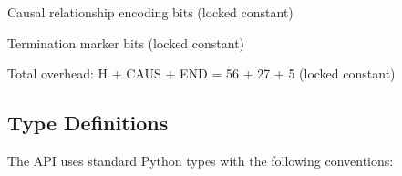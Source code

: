 \documentclass[letterpaper,10pt,english]{sphinxmanual}
\begin{document}

\begin{fulllineitems}
\label{\detokenize{api_reference:CLF_MAXIMAL_VALIDATOR_FINAL.CAUS}}
\pysigstartsignatures
\pysigline
{}
\pysigstopsignatures
\sphinxAtStartPar
Causal relationship encoding bits (locked constant)

\end{fulllineitems}


\begin{fulllineitems}
\label{\detokenize{api_reference:CLF_MAXIMAL_VALIDATOR_FINAL.END}}
\pysigstartsignatures
\pysigline
{}
\pysigstopsignatures
\sphinxAtStartPar
Termination marker bits (locked constant)

\end{fulllineitems}


\begin{fulllineitems}
\label{\detokenize{api_reference:CLF_MAXIMAL_VALIDATOR_FINAL.OVERHEAD}}
\pysigstartsignatures
\pysigline
{}
\pysigstopsignatures
\sphinxAtStartPar
Total overhead: H + CAUS + END = 56 + 27 + 5 (locked constant)

\end{fulllineitems}



\subsection{Type Definitions}
\label{\detokenize{api_reference:type-definitions}}
\sphinxAtStartPar
The API uses standard Python types with the following conventions:
\end{document}
